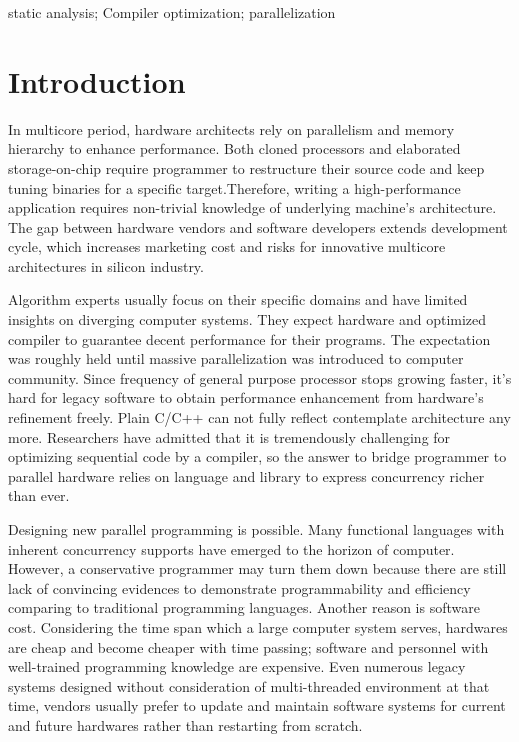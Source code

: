 \documentclass[10pt, conference, compsocconf]{IEEEtran}
\begin{document}
\begin{IEEEkeywords}
static analysis; Compiler optimization; parallelization
\end{IEEEkeywords}


%
\IEEEpeerreviewmaketitle

\section{Introduction}
In multicore period, hardware architects rely on parallelism and memory hierarchy to enhance performance. Both cloned processors and elaborated storage-on-chip require programmer to restructure their source code and keep tuning binaries for a specific target.Therefore, writing a high-performance application requires non-trivial knowledge of underlying machine's architecture. The gap between hardware vendors and software developers extends development cycle, which increases marketing cost and risks for innovative multicore architectures in silicon industry.

Algorithm experts usually focus on their specific domains and have limited insights on diverging computer systems. They expect hardware and optimized compiler to guarantee decent performance for their programs. The expectation was roughly held until massive parallelization was introduced to computer community. Since frequency of general purpose processor stops growing faster, it's hard for legacy software to obtain performance enhancement from hardware's refinement freely. Plain C/C++ can not fully reflect contemplate architecture any more. Researchers have admitted that it is tremendously challenging for optimizing sequential code by a compiler, so the answer to bridge programmer to parallel hardware relies on language and library to express concurrency richer than ever.

Designing new parallel programming is possible. Many functional languages \cite{b13} with inherent concurrency supports have emerged to the horizon of computer. However, a conservative programmer may turn them down because there are still lack of convincing evidences to demonstrate programmability and efficiency comparing to traditional programming languages. Another reason is software cost. Considering the time span which a large computer system serves, hardwares are cheap and become cheaper with time passing; software and personnel with well-trained programming knowledge are expensive. Even numerous legacy systems designed without consideration of multi-threaded environment at that time, vendors usually prefer to update and maintain software systems for current and future hardwares rather than restarting from scratch. 
\end{document}
